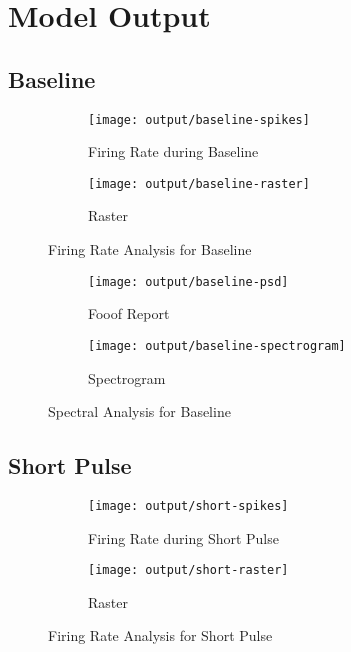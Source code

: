 \documentclass[12pt, letterpaper]{article}
\begin{document}
\section*{Model Output}

\subsection*{Baseline}

\begin{figure}[H]
  \centering
  \begin{subfigure}{\textwidth}
    \centering
    \texttt{[image: output/baseline-spikes]}
    \caption{Firing Rate during Baseline}
    \label{fig:baseline-spikes}
  \end{subfigure}
  \begin{subfigure}{\textwidth}
    \centering
    \texttt{[image: output/baseline-raster]}
    \caption{Raster}
    \label{fig:baseline-raster}
  \end{subfigure}
  \caption{Firing Rate Analysis for Baseline}
\end{figure}

\begin{figure}[H]
    \centering
    \begin{subfigure}{.75\textwidth}
      \centering
      \texttt{[image: output/baseline-psd]}
      \caption{Fooof Report}
      \label{fig:baseline-psd}
    \end{subfigure}
    \begin{subfigure}{.75\textwidth}
      \centering
      \texttt{[image: output/baseline-spectrogram]}
      \caption{Spectrogram}
      \label{fig:baseline-spectrogram}
    \end{subfigure}
    \caption{Spectral Analysis for Baseline}
\end{figure}

\subsection*{Short Pulse}

\begin{figure}[H]
  \centering
  \begin{subfigure}{\textwidth}
    \centering
    \texttt{[image: output/short-spikes]}
    \caption{Firing Rate during Short Pulse}
    \label{fig:short-spikes}
  \end{subfigure}
  \begin{subfigure}{\textwidth}
    \centering
    \texttt{[image: output/short-raster]}
    \caption{Raster}
    \label{fig:short-raster}
  \end{subfigure}
  \caption{Firing Rate Analysis for Short Pulse}
\end{figure}
\end{document}
